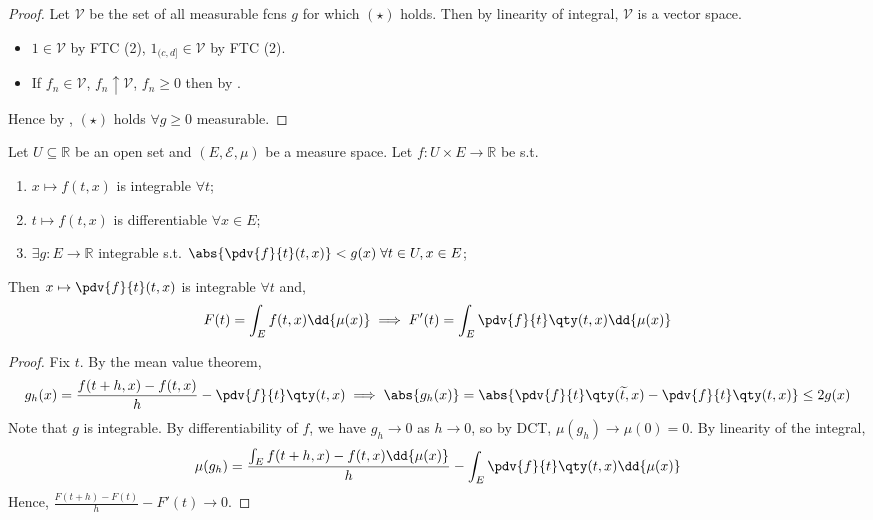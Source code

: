 \begin{proof}
	Let $\mathcal{V}$ be the set of all measurable fcns $g$ for which $(\star)$ holds.
	Then by linearity of integral, $\mathcal{V}$ is a vector space.
	\begin{itemize}
		\item $1 \in \mathcal{V}$ by FTC (2), $1_{(c, d]} \in \mathcal{V}$ by FTC (2).
		\item If $f_n \in \mathcal{V}$, $f_n \uparrow \mathcal{V}$, $f_n \geq 0$ then by .
	\end{itemize}
	Hence by , $(\star)$ holds $\forall g \geq 0$ measurable.
\end{proof}

\begin{theorem}
	Let $U \subseteq \mathbb R$ be an open set and $(E, \mathcal E, \mu)$ be a measure space.
	Let $f \colon U \times E \to \mathbb R$ be s.t.
	\begin{enumerate}
		\item $x \mapsto f(t, x)$ is integrable $\forall t$;
		\item $t \mapsto f(t,x)$ is differentiable $\forall x \in E$;
		\item $\exists g : E \to \mathbb{R}$ integrable s.t. $\abs{\pdv{f}{t}(t, x)} < g(x) \; \forall t \in U, x \in E$;
	\end{enumerate}
	Then $x \mapsto \pdv{f}{t}(t, x)$ is integrable $\forall t$ and,
	\[ F(t) = \int_E f(t,x) \dd{\mu(x)} \implies F'(t) = \int_E \pdv{f}{t}\qty(t,x) \dd{\mu(x)} \]
\end{theorem}

\begin{proof}
	Fix $t$.
	By the mean value theorem,
	\[ g_h(x) = \frac{f(t + h, x) - f(t, x)}{h} - \pdv{f}{t}\qty(t,x) \implies \abs{g_h(x)} = \abs{\pdv{f}{t}\qty(\widetilde t, x) - \pdv{f}{t}\qty(t, x)} \leq 2g(x) \]
	Note that $g$ is integrable.
	By differentiability of $f$, we have $g_h \to 0$ as $h \to 0$, so by DCT, $\mu(g_h) \to \mu(0) = 0$.
	By linearity of the integral,
	\[ \mu(g_h) = \frac{\int_E f(t + h, x) - f(t, x) \dd{\mu(x)}}{h} - \int_E \pdv{f}{t}\qty(t,x) \dd{\mu(x)} \]
	Hence, $\frac{F(t+h) - F(t)}{h} - F'(t) \to 0$.
\end{proof}

